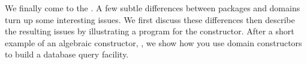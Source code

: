 
%
%
%
%
%


We finally come to the .
A few subtle differences between packages and
domains turn up some interesting issues.
We first discuss these differences then
describe the resulting issues by illustrating a program
for the  constructor.
After a short example of an algebraic constructor,
, we show how you use domain constructors to build
a database query facility.

